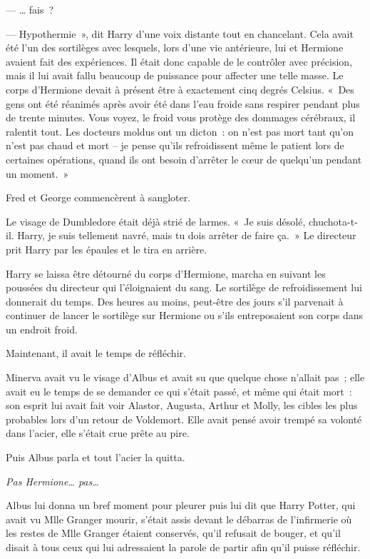 --- … fais~?

--- Hypothermie~», dit Harry d'une voix distante tout en chancelant. Cela avait été l'un des sortilèges avec lesquels, lors d'une vie antérieure, lui et Hermione avaient fait des expériences. Il était donc capable de le contrôler avec précision, mais il lui avait fallu beaucoup de puissance pour affecter une telle masse. Le corps d'Hermione devait à présent être à exactement cinq degrés Celsius. «~Des gens ont été réanimés après avoir été dans l'eau froide sans respirer pendant plus de trente minutes. Vous voyez, le froid vous protège des dommages cérébraux, il ralentit tout. Les docteurs moldus ont un dicton~: on n'est pas mort tant qu'on n'est pas chaud et mort -- je pense qu'ils refroidissent même le patient lors de certaines opérations, quand ils ont besoin d'arrêter le cœur de quelqu'un pendant un moment.~»

Fred et George commencèrent à sangloter.

Le visage de Dumbledore était déjà strié de larmes. «~Je suis désolé, chuchota-t-il. Harry, je suis tellement navré, mais tu dois arrêter de faire ça.~» Le directeur prit Harry par les épaules et le tira en arrière.

Harry se laissa être détourné du corps d'Hermione, marcha en suivant les poussées du directeur qui l'éloignaient du sang. Le sortilège de refroidissement lui donnerait du temps. Des heures au moins, peut-être des jours s'il parvenait à continuer de lancer le sortilège sur Hermione ou s'ils entreposaient son corps dans un endroit froid.

Maintenant, il avait le temps de réfléchir.

\later

Minerva avait vu le visage d'Albus et avait su que quelque chose n'allait pas~; elle avait eu le temps de se demander ce qui s'était passé, et même qui était mort~: son esprit lui avait fait voir Alastor, Augusta, Arthur et Molly, les cibles les plus probables lors d'un retour de Voldemort. Elle avait pensé avoir trempé sa volonté dans l'acier, elle s'était crue prête au pire.

Puis Albus parla et tout l'acier la quitta.

\emph{Pas Hermione… pas…}

Albus lui donna un bref moment pour pleurer puis lui dit que Harry Potter, qui avait vu Mlle Granger mourir, s'était assis devant le débarras de l'infirmerie où les restes de Mlle Granger étaient conservés, qu'il refusait de bouger, et qu'il disait à tous ceux qui lui adressaient la parole de partir afin qu'il puisse réfléchir.

